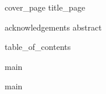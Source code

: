 \documentclass[12pt, a4paper, oneside]{report}
\begin{document}
    {cover_page}\clearpage
    {title_page}\clearpage

    \onehalfspacing

    {acknowledgements}\clearpage
    {abstract}\clearpage

    {table_of_contents}\clearpage
    \listoffigures\clearpage

    
    
    \listoftables
    
    \glsaddall
    \printglossary[type=\acronymtype, nonumberlist]\clearpage
    \printglossary[nonumberlist]\clearpage

    {main}

    \clearpage
    
    

    {main}
\end{document}
